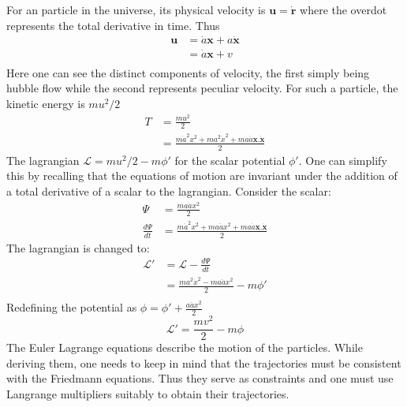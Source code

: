 \documentclass[12pt,a4paper,twoside]{book}
\begin{document}
			For an particle in the universe, its physical velocity is $\mathbf{u}=\dot{\mathbf{r}}$ where the overdot represents the total derivative in time. Thus
			$$
			\begin{aligned}
				\mathbf{u} &= \dot{a}\mathbf{x} + a\dot{\mathbf{x}}\\
									&=\dot{a}\mathbf{x} + v\\
			\end{aligned}
			$$
			Here one can see the distinct components of velocity, the first simply being hubble flow while the second represents peculiar velocity.
			For such a particle, the kinetic energy is $mu^2/2$
			$$
			\begin{aligned}
				T&=\frac{mu^2}{2}\\
				  &=\frac{m\dot{a}^2 x^2 + ma^2\dot{x}^2+ma\dot{a}\mathbf{x}.\mathbf{\dot{x}}}{2}
			\end{aligned}
			$$
			The lagrangian $\mathcal{L} = mu^2/2 - m\phi'$ for the scalar potential $\phi'$. One can simplify this by recalling that the equations of motion are invariant under the addition of a total derivative of a scalar to the lagrangian. Consider the scalar:
			$$
			\begin{aligned}
				\Psi &=\frac{ma\dot{a}x^2}{2}\\
				\frac{d\Psi}{dt}&=\frac{m\dot{a}^2 x^2 + ma\ddot{a}x^2+ma\dot{a}\mathbf{x}.\mathbf{\dot{x}}}{2}
			\end{aligned}
			$$
			The lagrangian is changed to:
			$$
			\begin{aligned}
				\mathcal{L}'&=\mathcal{L}-\frac{d\Psi}{dt}\\
									 &=\frac{ma^2\dot{x}^2-ma\ddot{a}x^2}{2}-m\phi'\\
			\end{aligned}
			$$
			Redefining the potential as $\phi = \phi'+\frac{a\ddot{a}x^2}{2}$
			\begin{equation}
				\mathcal{L}'=\frac{mv^2}{2}-m\phi
			\end{equation}
			The Euler Lagrange equations describe the motion of the particles. While deriving them, one needs to keep in mind that the trajectories must be consistent with the Friedmann equations. Thus they serve as constraints and one must use Langrange multipliers suitably to obtain their trajectories.
\end{document}
